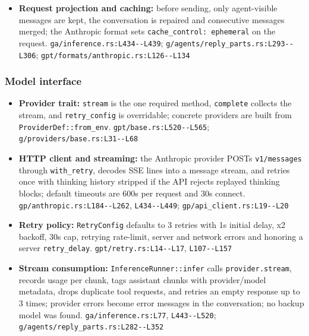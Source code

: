 \begin{itemize}
\item \textbf{Request projection and caching:} before sending, only agent-visible messages are kept, the conversation is repaired and consecutive messages merged; the Anthropic format sets \texttt{cache\_\allowbreak{}control:\allowbreak{} ephemeral} on the request. \texttt{ga/\allowbreak{}inference.\allowbreak{}rs:\allowbreak{}L434-\allowbreak{}-\allowbreak{}L439}; \texttt{g/\allowbreak{}agents/\allowbreak{}reply\_\allowbreak{}parts.\allowbreak{}rs:\allowbreak{}L293-\allowbreak{}-\allowbreak{}L306}; \texttt{gpt/\allowbreak{}formats/\allowbreak{}anthropic.\allowbreak{}rs:\allowbreak{}L126-\allowbreak{}-\allowbreak{}L134}
\end{itemize}

\subsubsection*{Model interface}
\begin{itemize}
\item \textbf{Provider trait:} \texttt{stream} is the one required method, \texttt{complete} collects the stream, and \texttt{retry\_\allowbreak{}config} is overridable; concrete providers are built from \texttt{ProviderDef:\allowbreak{}:\allowbreak{}from\_\allowbreak{}env}. \texttt{gpt/\allowbreak{}base.\allowbreak{}rs:\allowbreak{}L520-\allowbreak{}-\allowbreak{}L565}; \texttt{g/\allowbreak{}providers/\allowbreak{}base.\allowbreak{}rs:\allowbreak{}L31-\allowbreak{}-\allowbreak{}L68}
\item \textbf{HTTP client and streaming:} the Anthropic provider POSTs \texttt{v1/\allowbreak{}messages} through \texttt{with\_\allowbreak{}retry}, decodes SSE lines into a message stream, and retries once with thinking history stripped if the API rejects replayed thinking blocks; default timeouts are 600s per request and 30s connect. \texttt{gp/\allowbreak{}anthropic.\allowbreak{}rs:\allowbreak{}L184-\allowbreak{}-\allowbreak{}L262}, \texttt{L434-\allowbreak{}-\allowbreak{}L449}; \texttt{gp/\allowbreak{}api\_\allowbreak{}client.\allowbreak{}rs:\allowbreak{}L19-\allowbreak{}-\allowbreak{}L20}
\item \textbf{Retry policy:} \texttt{RetryConfig} defaults to 3 retries with 1s initial delay, x2 backoff, 30s cap, retrying rate-limit, server and network errors and honoring a server \texttt{retry\_\allowbreak{}delay}. \texttt{gpt/\allowbreak{}retry.\allowbreak{}rs:\allowbreak{}L14-\allowbreak{}-\allowbreak{}L17}, \texttt{L107-\allowbreak{}-\allowbreak{}L157}
\item \textbf{Stream consumption:} \texttt{InferenceRunner:\allowbreak{}:\allowbreak{}infer} calls \texttt{provider.\allowbreak{}stream}, records usage per chunk, tags assistant chunks with provider/model metadata, drops duplicate tool requests, and retries an empty response up to 3 times; provider errors become error messages in the conversation; no backup model was found. \texttt{ga/\allowbreak{}inference.\allowbreak{}rs:\allowbreak{}L77}, \texttt{L443-\allowbreak{}-\allowbreak{}L520}; \texttt{g/\allowbreak{}agents/\allowbreak{}reply\_\allowbreak{}parts.\allowbreak{}rs:\allowbreak{}L282-\allowbreak{}-\allowbreak{}L352}
\end{itemize}

